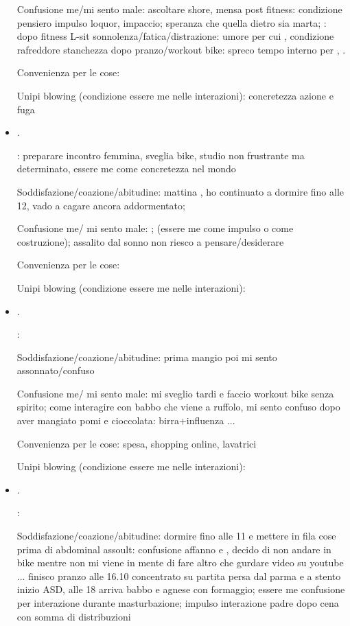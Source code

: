 \begin{itemize}
Confusione me/mi sento male: ascoltare shore, mensa post fitness: condizione pensiero impulso loquor, impaccio; speranza che quella dietro sia marta; : dopo fitness L-sit sonnolenza/fatica/distrazione: umore per cui , condizione rafreddore stanchezza dopo pranzo/workout bike: spreco tempo interno per , .

Convenienza per le cose: 

Unipi blowing (condizione essere me nelle interazioni): concretezza azione e fuga

\item {}.

: preparare incontro femmina, sveglia bike, studio non frustrante ma determinato, essere me come concretezza nel mondo

Soddisfazione/coazione/abitudine: mattina , ho continuato a dormire fino alle 12, vado a cagare ancora addormentato;

Confusione me/ mi sento male: ;  (essere me come impulso o come costruzione); assalito dal sonno non riesco a pensare/desiderare

Convenienza per le cose: 

Unipi blowing (condizione essere me nelle interazioni): 

\item {}.

: 

Soddisfazione/coazione/abitudine: prima mangio poi mi sento assonnato/confuso

Confusione me/ mi sento male: mi sveglio tardi e faccio workout bike senza spirito; come interagire con babbo che viene a ruffolo, mi sento confuso dopo aver mangiato pomi e cioccolata: birra+influenza ...

Convenienza per le cose: spesa, shopping online, lavatrici

Unipi blowing (condizione essere me nelle interazioni):

\item {}.

:

Soddisfazione/coazione/abitudine: dormire fino alle 11 e mettere in fila cose prima di abdominal assoult: confusione affanno e , decido di non andare in bike mentre non mi viene in mente di fare altro che gurdare video su youtube ... finisco pranzo alle 16.10 concentrato su partita persa dal parma e a stento inizio ASD, alle 18 arriva babbo e agnese con formaggio; essere me confusione per interazione durante masturbazione; impulso interazione padre dopo cena con somma di distribuzioni


\end{itemize}
